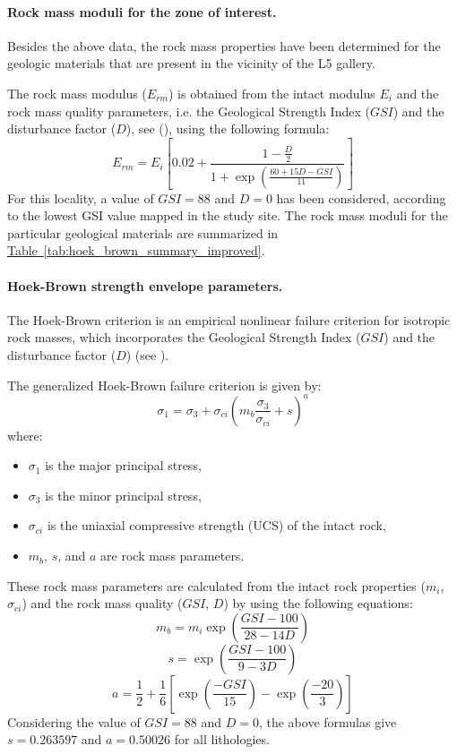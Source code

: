 \paragraph{Rock mass moduli for the zone of interest.}
Besides the above data, the rock mass properties have been determined for the geologic materials that are present in the vicinity of the L5 gallery.

The rock mass modulus ($E_{rm}$) is obtained from the intact modulus $E_i$ and the rock mass quality parameters, i.e. the Geological Strength Index ($GSI$) and the disturbance factor ($D$), see (\cite{hoek2019hoek}), using the following formula:
$$
E_{rm} = E_i \left[ 0.02 + \frac{1 - \frac{D}{2}}{1 + \exp \left( \frac{60 + 15D - GSI}{11} \right)} \right]
$$
For this locality, a value of $GSI = 88$ and $D=0$ has been considered, according to the lowest GSI value mapped in the study site.
The rock mass moduli for the particular geological materials are summarized in \hyperref[tab:hoek_brown_summary_improved]{Table~\ref{tab:hoek_brown_summary_improved}}.


\paragraph{Hoek-Brown strength envelope parameters.}
The Hoek-Brown criterion is an empirical nonlinear failure criterion for isotropic rock masses, which incorporates the Geological Strength Index ($GSI$) and the disturbance factor ($D$) (see \cite{hoek2019hoek}).

The generalized Hoek-Brown failure criterion is given by:
\begin{equation}\label{eq:hoek-brown}
\sigma_1 = \sigma_3 + \sigma_{ci} \left( m_b \frac{\sigma_3}{\sigma_{ci}} + s \right)^a
\end{equation}
where:
\begin{itemize}%
    \item $\sigma_1$ is the major principal stress,
    \item $\sigma_3$ is the minor principal stress,
    \item $\sigma_{ci}$ is the uniaxial compressive strength (UCS) of the intact rock,
    \item $m_b$, $s$, and $a$ are rock mass parameters.
\end{itemize}

These rock mass parameters are calculated from the intact rock properties ($m_i$, $\sigma_{ci}$) and the rock mass quality ($GSI$, $D$) by using the following equations:
$$
m_b = m_i \exp \left( \frac{GSI - 100}{28 - 14D} \right)
$$
$$
s = \exp \left( \frac{GSI - 100}{9 - 3D} \right)
$$
$$
a = \frac{1}{2} + \frac{1}{6} \left[ \exp \left( \frac{-GSI}{15} \right) - \exp \left( \frac{-20}{3} \right) \right]
$$
Considering the value of $GSI = 88$ and $D=0$, the above formulas give $s = 0.263597$ and $a = 0.50026$ for all lithologies.

